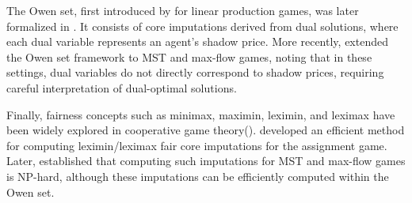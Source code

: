 The Owen set, first introduced by \cite{Owen1975} for linear production games, was later formalized in \cite{Owen.Characterization}. It consists of core imputations derived from dual solutions, where each dual variable represents an agent's shadow price. More recently, \cite{ggsv2024equitablefaircore} extended the Owen set framework to MST and max-flow games, noting that in these settings, dual variables do not directly correspond to shadow prices, requiring careful interpretation of dual-optimal solutions.

Finally, fairness concepts such as minimax, maximin, leximin, and leximax have been widely explored in cooperative game theory(\cite{minimax_group_fairness}). \cite{Vazirani-leximin} developed an efficient method for computing leximin/leximax fair core imputations for the assignment game. Later, \cite{ggsv2024equitablefaircore} established that computing such imputations for MST and max-flow games is NP-hard, although these imputations can be efficiently computed within the Owen set.



